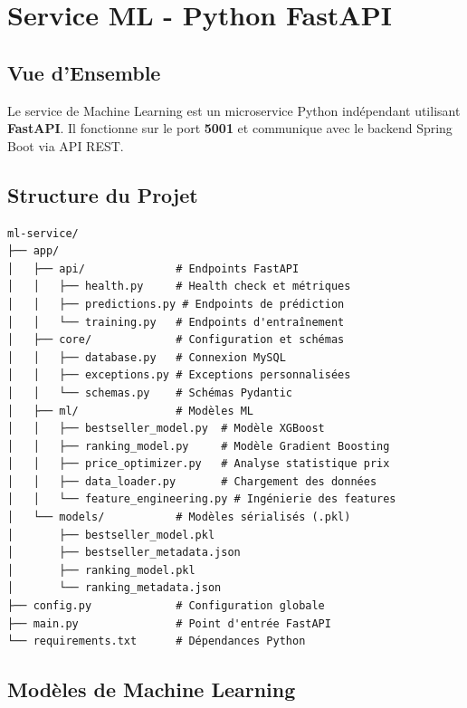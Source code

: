 \documentclass[12pt,a4paper]{report}
\begin{document}
\chapter{Service ML - Python FastAPI}

\section{Vue d'Ensemble}

Le service de Machine Learning est un microservice Python indépendant utilisant \textbf{FastAPI}. Il fonctionne sur le port \textbf{5001} et communique avec le backend Spring Boot via API REST.

\section{Structure du Projet}

\begin{verbatim}
ml-service/
├── app/
│   ├── api/              # Endpoints FastAPI
│   │   ├── health.py     # Health check et métriques
│   │   ├── predictions.py # Endpoints de prédiction
│   │   └── training.py   # Endpoints d'entraînement
│   ├── core/             # Configuration et schémas
│   │   ├── database.py   # Connexion MySQL
│   │   ├── exceptions.py # Exceptions personnalisées
│   │   └── schemas.py    # Schémas Pydantic
│   ├── ml/               # Modèles ML
│   │   ├── bestseller_model.py  # Modèle XGBoost
│   │   ├── ranking_model.py     # Modèle Gradient Boosting
│   │   ├── price_optimizer.py   # Analyse statistique prix
│   │   ├── data_loader.py       # Chargement des données
│   │   └── feature_engineering.py # Ingénierie des features
│   └── models/           # Modèles sérialisés (.pkl)
│       ├── bestseller_model.pkl
│       ├── bestseller_metadata.json
│       ├── ranking_model.pkl
│       └── ranking_metadata.json
├── config.py             # Configuration globale
├── main.py               # Point d'entrée FastAPI
└── requirements.txt      # Dépendances Python
\end{verbatim}

\section{Modèles de Machine Learning}
\end{document}
